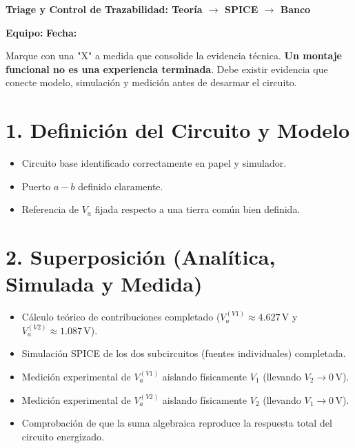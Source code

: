 \documentclass[11pt, a4paper]{article}
\begin{document}
\begin{tcolorbox}[colback=ucbblue!5!white, colframe=ucbblue, title=\textbf{Lista de Verificación: Cierre de Experiencia Integrada A}]
    \centering \textbf{Triage y Control de Trazabilidad: Teoría $\rightarrow$ SPICE $\rightarrow$ Banco}
\end{tcolorbox}

\textbf{Equipo:} \hrulefill \quad \textbf{Fecha:} \hrulefill

\vspace{0.3cm}
\noindent Marque con una "X" a medida que consolide la evidencia técnica. \textbf{Un montaje funcional no es una experiencia terminada}. Debe existir evidencia que conecte modelo, simulación y medición antes de desarmar el circuito.

\section*{1. Definición del Circuito y Modelo}
\begin{itemize}\setlength\itemsep{0.1em}
    \item[$\square$] Circuito base identificado correctamente en papel y simulador.
    \item[$\square$] Puerto $a-b$ definido claramente.
    \item[$\square$] Referencia de $V_a$ fijada respecto a una tierra común bien definida.
\end{itemize}

\section*{2. Superposición (Analítica, Simulada y Medida)}
\begin{itemize}\setlength\itemsep{0.1em}
    \item[$\square$] Cálculo teórico de contribuciones completado ($V_a^{(V1)} \approx 4.627\,\text{V}$ y $V_a^{(V2)} \approx 1.087\,\text{V}$).
    \item[$\square$] Simulación SPICE de los dos subcircuitos (fuentes individuales) completada.
    \item[$\square$] Medición experimental de $V_a^{(V1)}$ aislando físicamente $V_1$ (llevando $V_2 \rightarrow 0\,\text{V}$).
    \item[$\square$] Medición experimental de $V_a^{(V2)}$ aislando físicamente $V_2$ (llevando $V_1 \rightarrow 0\,\text{V}$).
    \item[$\square$] Comprobación de que la suma algebraica reproduce la respuesta total del circuito energizado.
\end{itemize}
\end{document}
